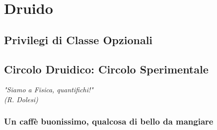 \chapter{Druido}

\section{Privilegi di Classe Opzionali}

\section{Circolo Druidico: Circolo Sperimentale}

\begin{DndReadAloud}
  \it
  "Siamo a Fisica, quantifichi!" \\ (R. Dolesi)
\end{DndReadAloud}

\subsection{Un caffè buonissimo, qualcosa di bello da mangiare}
